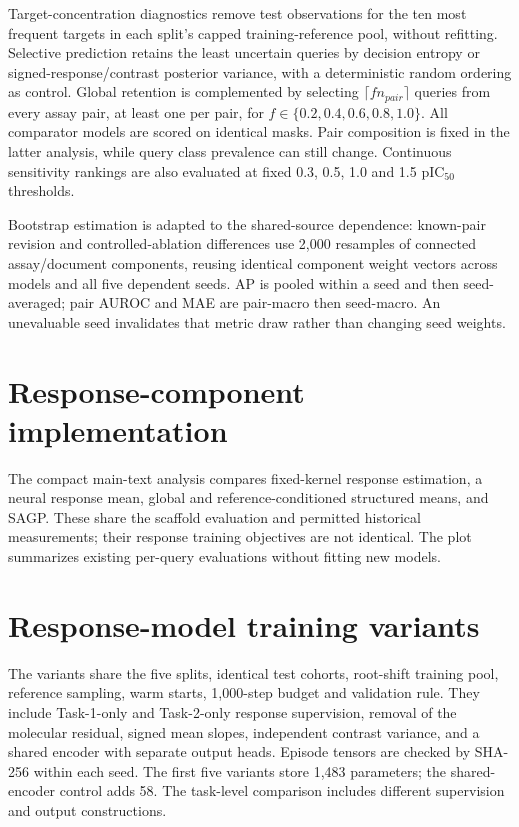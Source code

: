 \documentclass[letterpaper]{article}
\begin{document}
Target-concentration diagnostics remove test observations for the ten most frequent targets in each split's capped training-reference pool, without refitting. Selective prediction retains the least uncertain queries by decision entropy or signed-response/contrast posterior variance, with a deterministic random ordering as control. Global retention is complemented by selecting $\lceil f n_{pair}\rceil$ queries from every assay pair, at least one per pair, for $f\in\{0.2,0.4,0.6,0.8,1.0\}$. All comparator models are scored on identical masks. Pair composition is fixed in the latter analysis, while query class prevalence can still change. Continuous sensitivity rankings are also evaluated at fixed 0.3, 0.5, 1.0 and 1.5 pIC$_{50}$ thresholds.

Bootstrap estimation \citep{efron1979bootstrap} is adapted to the shared-source dependence: known-pair revision and controlled-ablation differences use 2,000 resamples of connected assay/document components, reusing identical component weight vectors across models and all five dependent seeds. AP is pooled within a seed and then seed-averaged; pair AUROC and MAE are pair-macro then seed-macro. An unevaluable seed invalidates that metric draw rather than changing seed weights.



\section{Response-component implementation}

The compact main-text analysis compares fixed-kernel response estimation, a neural response mean, global and reference-conditioned structured means, and SAGP. These share the scaffold evaluation and permitted historical measurements; their response training objectives are not identical. The plot summarizes existing per-query evaluations without fitting new models.

\section{Response-model training variants}

The variants share the five splits, identical test cohorts, root-shift training pool, reference sampling, warm starts, 1,000-step budget and validation rule. They include Task-1-only and Task-2-only response supervision, removal of the molecular residual, signed mean slopes, independent contrast variance, and a shared encoder with separate output heads. Episode tensors are checked by SHA-256 within each seed. The first five variants store 1,483 parameters; the shared-encoder control adds 58. The task-level comparison includes different supervision and output constructions.
\end{document}
